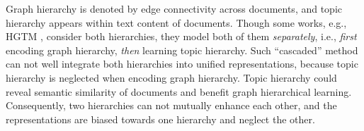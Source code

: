 Graph hierarchy is denoted by edge connectivity across documents, and topic hierarchy appears within text content of documents. %
Though some works, e.g., HGTM \cite{hgtm}, consider both hierarchies, they model both of them \emph{separately}, i.e., \emph{first} encoding graph hierarchy, \emph{then} learning topic hierarchy. Such ``cascaded'' method can not well integrate both hierarchies into unified representations, because topic hierarchy is neglected when encoding graph hierarchy. Topic hierarchy could reveal semantic similarity of documents and benefit graph hierarchical learning. Consequently, two hierarchies can not mutually enhance each other, and the representations are biased towards one hierarchy and neglect the other.




